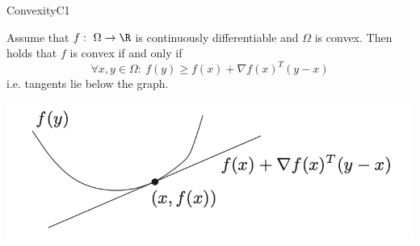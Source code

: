\begin{theo}{ConvexityC1}
    \begin{minipage}{0.60\textwidth}
        Assume that $f: \ \Omega \rightarrow \R$ is continuously differentiable and $\Omega$ is convex. Then holds that $f$ is convex if and only if 
        \begin{equation*}
            \forall x,y \in \Omega: \ f(y) \geq f(x) + \nabla f(x)^T(y-x)
        \end{equation*}
        i\@.e\@. tangents lie below the graph.
    \end{minipage}
    \begin{minipage}{0.3\textwidth}
        \begin{center}
            \includegraphics[scale = 0.45]{Images/Fundamental/C1Convexity.png}
        \end{center}
    \end{minipage}
\end{theo}

